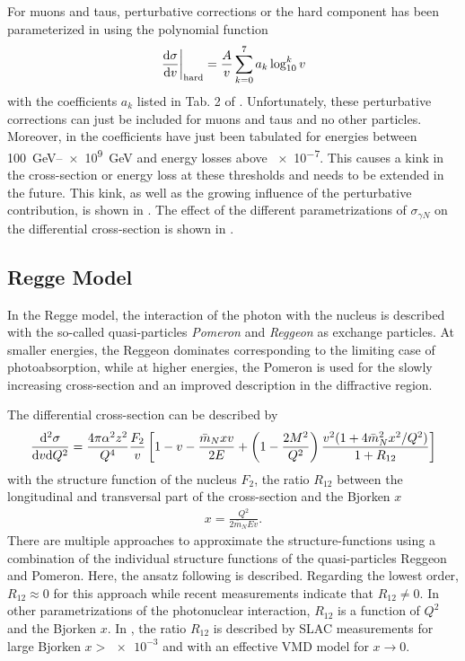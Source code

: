 For muons and taus, perturbative corrections or the hard component has been parameterized in \cite{Bugaev04HardComponent} using the polynomial function
\begin{align}
    \left. \frac{\mathrm{d} \sigma}{\mathrm{d} v} \right|_{\text{hard}} =
    \frac{A}{v} \sum\limits_{k=0}^7 a_k \log_{10}^k v
\end{align}
with the coefficients $a_k$ listed in Tab. 2 of \cite{Bugaev04HardComponent}.
Unfortunately, these perturbative corrections can just be included for muons and taus and no other particles.
Moreover, in \cite{Bugaev04HardComponent} the coefficients have just been tabulated for energies between \SIrange{100}{e9}{GeV} and energy losses above \num{e-7}.
This causes a kink in the cross-section or energy loss at these thresholds and needs to be extended in the future.
This kink, as well as the growing influence of the perturbative contribution, is shown in .
The effect of the different parametrizations of $\sigma_{\gamma N}$ on the differential cross-section is shown in .

\subsection{Regge Model} \label{sec:photo_regge}

In the Regge model, the interaction of the photon with the nucleus is described with the so-called quasi-particles \textit{Pomeron} and \textit{Reggeon} as exchange particles.
At smaller energies, the Reggeon dominates corresponding to the limiting case of photoabsorption, while at higher energies, the Pomeron is used for the slowly increasing cross-section and an improved description in the diffractive region.

The differential cross-section can be described by \cite{Abramowicz91}
\begin{align} \label{eq:photo_dsigma_regge}
    \frac{\mathrm{d}^2 \sigma}{\mathrm{d} v \mathrm{d} Q^2} = \frac{4 \pi \alpha^2 z^2}{Q^4} \frac{F_2}{v}
    \left[
        1 - v - \frac{\bar{m}_N xv}{2E} +
        \left(1 - \frac{2M^2}{Q^2} \right) \frac{v^2 (1 + 4 \bar{m}_N^2 x^2 / Q^2)}{1 + R_{12}}
    \right]
\end{align}
with the structure function of the nucleus $F_2$, the ratio $R_{12}$ between the longitudinal and transversal part of the cross-section and the Bjorken $x$
\begin{align}
    x = \frac{Q^2}{2 \bar{m}_N E v} .
\end{align}
There are multiple approaches \cite{Abramowicz91, Butkevich02} to approximate the structure-functions using a combination of the individual structure functions of the quasi-particles Reggeon and Pomeron.
Here, the ansatz following \cite{Abramowicz91} is described.
Regarding the lowest order, $R_{12} \approx 0$ for this approach while recent measurements indicate that $R_{12} \neq 0$.
In other parametrizations of the photonuclear interaction, $R_{12}$ is a function of $Q^2$ and the Bjorken $x$.
In \cite{Butkevich02}, the ratio $R_{12}$ is described by SLAC measurements \cite{Abe99} for large Bjorken $x > \num{e-3}$ and with an effective VMD model \cite{Martin99} for $x \to 0$.

